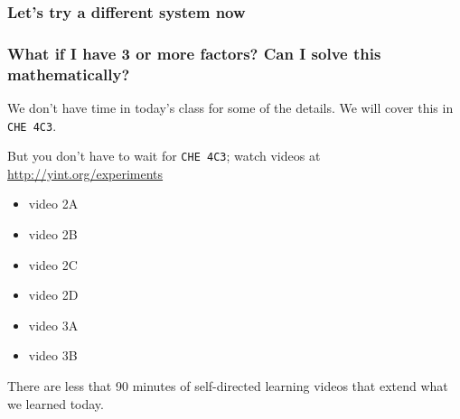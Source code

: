 \begin{frame}\frametitle{Let's try a different system now}
\end{frame}

\begin{frame}\frametitle{What if I have 3 or more factors? Can I solve this mathematically?}
	
	We don't have time in today's class for some of the details. We will cover this in \texttt{CHE 4C3}.
	
	\vspace{12pt}
	But you don't have to wait for \texttt{CHE 4C3}; watch videos at \href{http://yint.org/experiments}{http://yint.org/experiments}
	\begin{itemize}
		\item	video 2A
		\item	video 2B
		\item	video 2C
		\item	video 2D
		\item	video 3A
		\item	video 3B
	\end{itemize}
	
	\begin{exampleblock}{}
		There are less that 90 minutes of self-directed learning videos that extend what we learned today.
	\end{exampleblock}
	
\end{frame}

